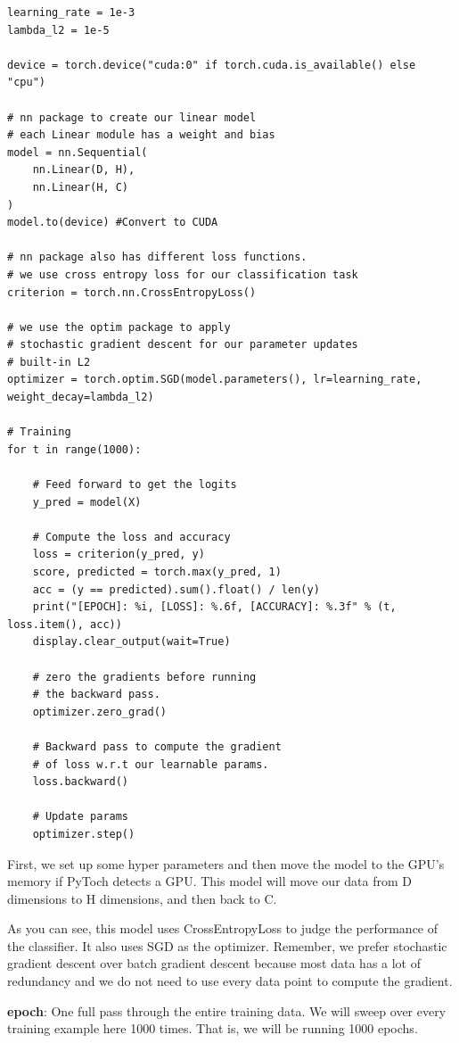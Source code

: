 \begin{verbatim}
learning_rate = 1e-3
lambda_l2 = 1e-5

device = torch.device("cuda:0" if torch.cuda.is_available() else "cpu")

# nn package to create our linear model
# each Linear module has a weight and bias
model = nn.Sequential(
    nn.Linear(D, H),
    nn.Linear(H, C)
)
model.to(device) #Convert to CUDA

# nn package also has different loss functions.
# we use cross entropy loss for our classification task
criterion = torch.nn.CrossEntropyLoss()

# we use the optim package to apply
# stochastic gradient descent for our parameter updates
# built-in L2
optimizer = torch.optim.SGD(model.parameters(), lr=learning_rate, weight_decay=lambda_l2)

# Training
for t in range(1000):
    
    # Feed forward to get the logits
    y_pred = model(X)
    
    # Compute the loss and accuracy
    loss = criterion(y_pred, y)
    score, predicted = torch.max(y_pred, 1)
    acc = (y == predicted).sum().float() / len(y)
    print("[EPOCH]: %i, [LOSS]: %.6f, [ACCURACY]: %.3f" % (t, loss.item(), acc))
    display.clear_output(wait=True)
    
    # zero the gradients before running
    # the backward pass.
    optimizer.zero_grad()
    
    # Backward pass to compute the gradient
    # of loss w.r.t our learnable params. 
    loss.backward()
    
    # Update params
    optimizer.step()
\end{verbatim}

First, we set up some hyper parameters and then move the model to the GPU's memory if PyToch detects a GPU. 
This model will move our data from D dimensions to H dimensions, and then back to C. 

As you can see, this model uses CrossEntropyLoss to judge the performance of the classifier. 
It also uses SGD as the optimizer. 
Remember, we prefer stochastic gradient descent over batch gradient descent because most data has a lot of redundancy and we do not need to use every data point to compute the gradient. 

\textbf{epoch}: One full pass through the entire training data. 
We will sweep over every training example here 1000 times. 
That is, we will be running 1000 epochs.


